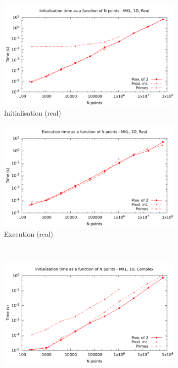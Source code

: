 \documentclass[12pt, a4paper]{article} \setlength{\textheight}{24cm}
\begin{document}
\begin{figure}[htb]
  \captionsetup{width=0.8\linewidth}
  \centering
  \begin{subfigure}{.5\textwidth}
    \centering
    \includegraphics[width=.9\linewidth]{graphs/1d-mkl-init-r.pdf}
    \caption{Initialisation (real)}
    \label{1DMKLRI}
  \end{subfigure}%
  \begin{subfigure}{.5\textwidth}
    \centering
    \includegraphics[width=.9\linewidth]{graphs/1d-mkl-exec-r.pdf}
    \caption{Execution (real)}
    \label{1DMKLR}
  \end{subfigure}\\
  \begin{subfigure}{.5\textwidth}
    \centering
    \includegraphics[width=.9\linewidth]{graphs/1d-mkl-init-c.pdf}

\end{subfigure}
\end{figure}
\end{document}
